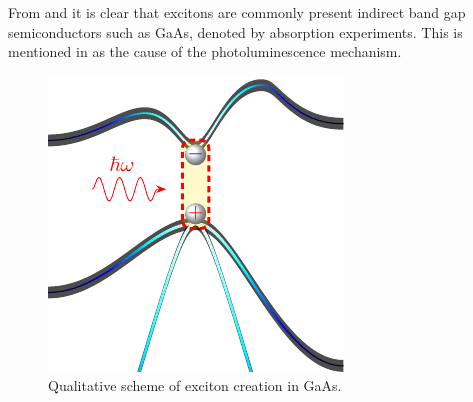 From  and   it is clear that excitons are commonly present indirect band gap semiconductors such as GaAs, denoted by absorption experiments. This is mentioned in  as the cause of the photoluminescence mechanism.
\begin{figure}[H]
	\centering
	\includegraphics[width=0.5\linewidth]{../figures/chapter-1/exciton-1/build/x-1}
	\caption{Qualitative scheme of exciton creation in GaAs.}
	\label{fig:subsubsection-1.1.1-x-1}
\end{figure}

